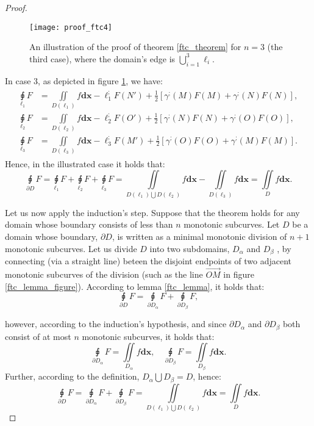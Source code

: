 \documentclass[11pt]{book}
\begin{document}
\begin{proof}
\begin{figure}
\texttt{[image: proof\_ftc4]}
\caption{An illustration of the proof of theorem \ref{ftc_theorem} for $n=3$ (the third case), where the domain’s edge is $\bigcup_{i=1}^{3}\ell_{i}$.}
\label{ftc_proof4_fig}
\end{figure}

In case 3, as depicted in figure \ref{ftc_proof4_fig}, we have:
\begin{align}
\begin{aligned}
\underset{\ell_{1}}{\sqint}F & =\underset{D\left(\ell_{1}\right)}{\iint}f\boldsymbol{dx}-\ell_{1}^{;}F\left(N'\right)+\frac{1}{2}\left[\gamma^{;}\left(M\right)F\left(M\right)+\gamma^{;}\left(N\right)F\left(N\right)\right],\\
\underset{\ell_{2}}{\sqint}F & =\underset{D\left(\ell_{2}\right)}{\iint}f\boldsymbol{dx}-\ell_{2}^{;}F\left(O'\right)+\frac{1}{2}\left[\gamma^{;}\left(N\right)F\left(N\right)+\gamma^{;}\left(O\right)F\left(O\right)\right],\\
\underset{\ell_{3}}{\sqint}F & =\underset{D\left(\ell_{3}\right)}{\iint}f\boldsymbol{dx}-\ell_{3}^{;}F\left(M'\right)+\frac{1}{2}\left[\gamma^{;}\left(O\right)F\left(O\right)+\gamma^{;}\left(M\right)F\left(M\right)\right].
\end{aligned}
\end{align}
Hence, in the illustrated case it holds that:
\[
\underset{\partial D}{\sqint}F=\underset{\ell_{1}}{\sqint}F+\underset{\ell_{2}}{\sqint}F+\underset{\ell_{3}}{\sqint}F=\underset{D\left(\ell_{1}\right)\bigcup D\left(\ell_{2}\right)}{\iint}f\boldsymbol{dx}-\underset{D\left(\ell_{3}\right)}{\iint}f\boldsymbol{dx}=\underset{D}{\iint}f\boldsymbol{dx}.
\]

Let us now apply the induction's step. Suppose that the theorem holds
for any domain whose boundary consists of less than $n$ monotonic
subcurves. Let $D$ be a domain whose boundary, $\partial D$, is
written as a minimal monotonic division of $n+1$ monotonic subcurves.
Let us divide $D$ into two subdomains, $D_{\alpha}$ and $D_{\beta}$
, by connecting (via a straight line) beteen the disjoint endpoints
of two adjacent monotonic subcurves of the division (such as the line
$\overrightarrow{OM}$ in figure \ref{ftc_lemma_figure}). According to lemma \ref{ftc_lemma}, it holds
that:
\[
\underset{\partial D}{\sqint}F=\underset{\partial D_{\alpha}}{\sqint}F+\underset{\partial D_{\beta}}{\sqint}F,
\]

however, according to the induction's hypothesis, and since $\partial D_{\alpha}$
and $\partial D_{\beta}$ both consist of at most $n$ monotonic subcurves,
it holds that:
\[
\underset{\partial D_{\alpha}}{\sqint}F=\underset{D_{\alpha}}{\iint}f\boldsymbol{dx},\quad\underset{\partial D_{\beta}}{\sqint}F=\underset{D_{\beta}}{\iint}f\boldsymbol{dx}.
\]
Further, according to the definition, $D_{\alpha}\bigcup D_{\beta}=D$,
hence:
\[
\underset{\partial D}{\sqint}F=\underset{\partial D_{\alpha}}{\sqint}F+\underset{\partial D_{\beta}}{\sqint}F=\underset{D\left(\ell_{1}\right)\bigcup D\left(\ell_{2}\right)}{\iint}f\boldsymbol{dx}=\underset{D}{\iint}f\boldsymbol{dx}.
\]
\end{proof}
\end{document}
